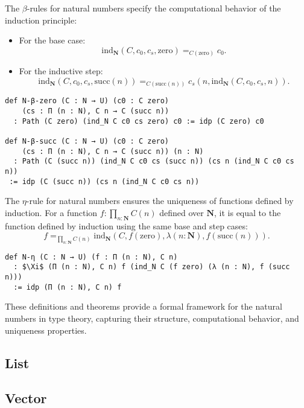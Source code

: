 \documentclass{article}
\begin{document}
\begin{theorem}
The $\beta$-rules for natural numbers specify the computational behavior of the induction principle:
\begin{itemize}
    \item For the base case:
    \[
    \mathrm{ind}_\mathbf{N}(C, c_0, c_s, \mathrm{zero}) =_{C(\mathrm{zero})} c_0.
    \]
    \item For the inductive step:
    \[
    \mathrm{ind}_\mathbf{N}(C, c_0, c_s, \mathrm{succ}(n)) =_{C(\mathrm{succ}(n))} c_s(n, \mathrm{ind}_\mathbf{N}(C, c_0, c_s, n)).
    \]
\end{itemize}
\begin{lstlisting}[mathescape=true]
def N-β-zero (C : N → U) (c0 : C zero)
    (cs : Π (n : N), C n → C (succ n))
  : Path (C zero) (ind_N C c0 cs zero) c0 := idp (C zero) c0

def N-β-succ (C : N → U) (c0 : C zero)
    (cs : Π (n : N), C n → C (succ n)) (n : N)
  : Path (C (succ n)) (ind_N C c0 cs (succ n)) (cs n (ind_N C c0 cs n))
 := idp (C (succ n)) (cs n (ind_N C c0 cs n))
\end{lstlisting}
\end{theorem}

\begin{theorem}
The $\eta$-rule for natural numbers ensures the uniqueness of functions defined by induction. For a function $f : \prod_{n : \mathbf{N}} C(n)$ defined over $\mathbf{N}$, it is equal to the function defined by induction using the same base and step cases:
\[
f =_{\prod_{n : \mathbf{N}} C(n)} \mathrm{ind}_\mathbf{N}(C, f(\mathrm{zero}), \lambda (n : \mathbf{N}), f(\mathrm{succ}(n))).
\]
\begin{lstlisting}[mathescape=true]
def N-η (C : N → U) (f : Π (n : N), C n)
  : $\Xi$ (Π (n : N), C n) f (ind_N C (f zero) (λ (n : N), f (succ n)))
  := idp (Π (n : N), C n) f
\end{lstlisting}
\end{theorem}

These definitions and theorems provide a formal framework for the natural numbers in type theory, capturing their structure, computational behavior, and uniqueness properties.

\subsection{List}

\subsection{Vector}
\end{document}
